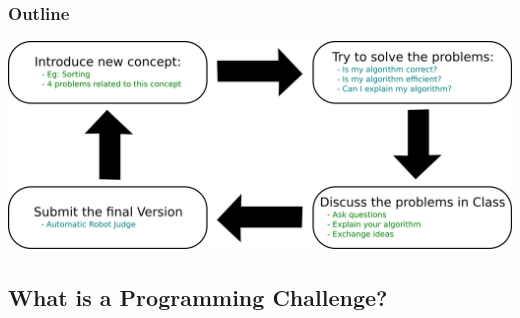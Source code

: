 \documentclass{beamer}
\begin{document}
\begin{frame}
  \frametitle{Outline}
  \begin{center}
    \includegraphics[width=1\textwidth]{classoutline}
  \end{center}
\end{frame}

\subsection{What is a Programming Challenge?}
\end{document}
